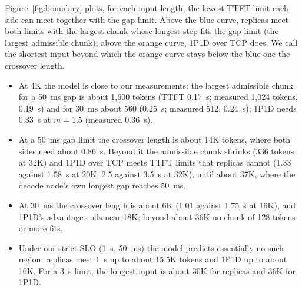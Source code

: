 \documentclass[11pt]{article}
\begin{document}
Figure~\ref{fig:boundary} plots, for each input length, the lowest TTFT limit each side can meet together with the gap limit. Above the blue curve, replicas meet both limits with the largest chunk whose longest step fits the gap limit (the largest admissible chunk); above the orange curve, 1P1D over TCP does. We call the shortest input beyond which the orange curve stays below the blue one the crossover length.
\begin{itemize}
  \item At 4K the model is close to our measurements: the largest admissible chunk for a 50~ms gap is about 1,600 tokens (TTFT 0.17~s; measured 1,024 tokens, 0.19~s) and for 30~ms about 560 (0.25~s; measured 512, 0.24~s); 1P1D needs 0.33~s at $m = 1.5$ (measured 0.36~s).
  \item At a 50~ms gap limit the crossover length is about 14K tokens, where both sides need about 0.86~s. Beyond it the admissible chunk shrinks (336 tokens at 32K) and 1P1D over TCP meets TTFT limits that replicas cannot (1.33 against 1.58~s at 20K, 2.5 against 3.5~s at 32K), until about 37K, where the decode node's own longest gap reaches 50~ms.
  \item At 30~ms the crossover length is about 6K (1.01 against 1.75~s at 16K), and 1P1D's advantage ends near 18K; beyond about 36K no chunk of 128 tokens or more fits.
  \item Under our strict SLO (1~s, 50~ms) the model predicts essentially no such region: replicas meet 1~s up to about 15.5K tokens and 1P1D up to about 16K. For a 3~s limit, the longest input is about 30K for replicas and 36K for 1P1D.
\end{itemize}
\end{document}
